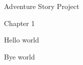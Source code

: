 \documentclass{article}
\begin{document}
\Huge Adventure Story Project

Chapter 1

Hello world 

Bye world
\end{document}
